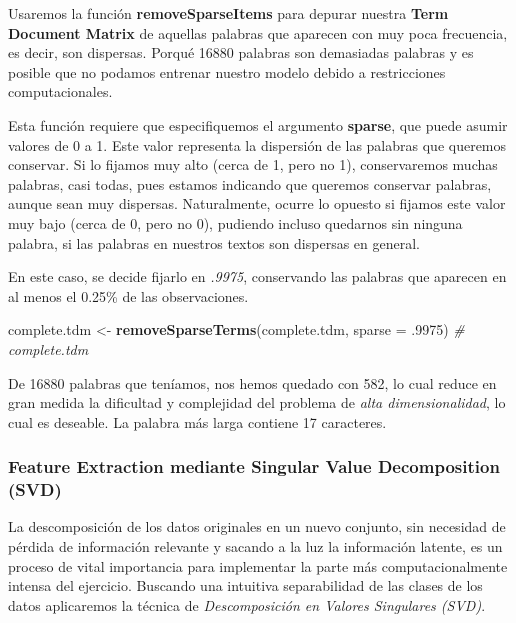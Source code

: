 \documentclass[
]{article}
\newenvironment{Shaded}{\begin{snugshade}}{\end{snugshade}}
\newcommand{\CommentTok}[1]{\textcolor[rgb]{0.56,0.35,0.01}{\textit{#1}}}
\newcommand{\DataTypeTok}[1]{\textcolor[rgb]{0.13,0.29,0.53}{#1}}
\newcommand{\FloatTok}[1]{\textcolor[rgb]{0.00,0.00,0.81}{#1}}
\newcommand{\KeywordTok}[1]{\textcolor[rgb]{0.13,0.29,0.53}{\textbf{#1}}}
\newcommand{\NormalTok}[1]{#1}
\newcommand{\StringTok}[1]{\textcolor[rgb]{0.31,0.60,0.02}{#1}}
\begin{document}
Usaremos la función \textbf{removeSparseItems} para depurar nuestra
\textbf{Term Document Matrix} de aquellas palabras que aparecen con muy
poca frecuencia, es decir, son dispersas. Porqué 16880 palabras son
demasiadas palabras y es posible que no podamos entrenar nuestro modelo
debido a restricciones computacionales.

Esta función requiere que especifiquemos el argumento \textbf{sparse},
que puede asumir valores de 0 a 1. Este valor representa la dispersión
de las palabras que queremos conservar. Si lo fijamos muy alto (cerca de
1, pero no 1), conservaremos muchas palabras, casi todas, pues estamos
indicando que queremos conservar palabras, aunque sean muy dispersas.
Naturalmente, ocurre lo opuesto si fijamos este valor muy bajo (cerca de
0, pero no 0), pudiendo incluso quedarnos sin ninguna palabra, si las
palabras en nuestros textos son dispersas en general.

En este caso, se decide fijarlo en \emph{.9975}, conservando las
palabras que aparecen en al menos el 0.25\% de las observaciones.

\begin{Shaded}
\begin{Highlighting}[]
\NormalTok{complete.tdm <-}\StringTok{ }\KeywordTok{removeSparseTerms}\NormalTok{(complete.tdm, }\DataTypeTok{sparse =} \FloatTok{.9975}\NormalTok{)}
\CommentTok{# complete.tdm}
\end{Highlighting}
\end{Shaded}

De 16880 palabras que teníamos, nos hemos quedado con 582, lo cual
reduce en gran medida la dificultad y complejidad del problema de
\emph{alta dimensionalidad}, lo cual es deseable. La palabra más larga
contiene 17 caracteres.

\hypertarget{feature-extraction-mediante-singular-value-decomposition-svd}{%
\subsubsection{Feature Extraction mediante Singular Value Decomposition
(SVD)}\label{feature-extraction-mediante-singular-value-decomposition-svd}}

La descomposición de los datos originales en un nuevo conjunto, sin
necesidad de pérdida de información relevante y sacando a la luz la
información latente, es un proceso de vital importancia para implementar
la parte más computacionalmente intensa del ejercicio. Buscando una
intuitiva separabilidad de las clases de los datos aplicaremos la
técnica de \emph{Descomposición en Valores Singulares (SVD)}.
\end{document}
